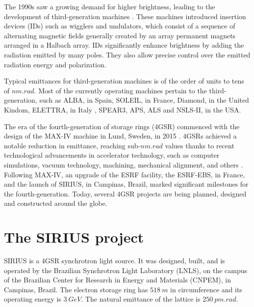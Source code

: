 The 1990s saw a growing demand for higher brightness, leading to the development of third-generation machines \cite{liu_towards_2017}. These machines introduced insertion devices (IDs) such as wigglers and undulators, which consist of a sequence of alternating magnetic fields generally created by an array permanent magnets arranged in a Halbach array. IDs significantly enhance brightness by adding the radiation emitted by many poles. They also allow precise control over the emitted radiation energy and polarization.

Typical emittances for third-generation machines is of the order of units to tens of $\unit{nm}.\unit{rad}$. Most of the currently operating machines pertain to the third-generation, such as ALBA, in Spain, SOLEIL, in France, Diamond, in the United Kindom, ELETTRA, in Italy \cite{simoulin_synchrotron_2016}, SPEAR3, APS, ALS and NSLS-II, in the USA.

The era of the fourth-generation of storage rings (4GSR) commenced with the design of the MAX-IV machine in Lund, Sweden, in 2015 \cite{liu_towards_2017,hettel_challenges_2014}. 4GSRs achieved a notable reduction in emittance, reaching sub-$\unit{nm}.\unit{rad}$ values thanks to recent technological advancements in accelerator technology, such as computer simulations, vacuum technology, machining, mechanical alignment, and others  \cite{hettel_challenges_2014,liu_towards_2017}. Following MAX-IV, an upgrade of the ESRF facility, the ESRF-EBS, in France, and the launch of SIRIUS, in Campinas, Brazil, marked significant milestones for the fourth-generation. Today, several 4GSR projects are being planned, designed and constructed around the globe.

\section*{The SIRIUS project}

SIRIUS is a 4GSR synchrotron light source. It was designed, built, and is operated by the Brazilian Synchrotron Light Laboratory (LNLS), on the campus of the Brazilian Center for Research in Energy and Materials (CNPEM), in Campinas, Brazil. The electron storage ring has $518~\unit{m}$ in circumference and its operating energy is $3~\unit{GeV}$. The natural emittance of the lattice is $250~\unit{pm}.\unit{rad}$. 

